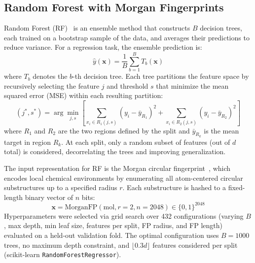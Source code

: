 \documentclass[journal=jcisd8,manuscript=article]{achemso}
\newcommand{\vect}[1]{\mathbf{#1}}
\newcommand{\removed}[1]{{\color{removedred}#1}}
\begin{document}
\FloatBarrier
\subsection{Random Forest with Morgan Fingerprints}
\label{sec:rf}

\removed{Random Forest (RF)~\cite{breiman2001random} is an ensemble method that constructs $B$ decision trees, each trained on a bootstrap sample of the data, and averages their predictions to reduce variance.
For a regression task, the ensemble prediction is:
\begin{equation}
 \hat{y}(\vect{x}) = \frac{1}{B} \sum_{b=1}^{B} T_b(\vect{x})
\end{equation}
where $T_b$ denotes the $b$-th decision tree.
Each tree partitions the feature space by recursively selecting the feature $j$ and threshold $s$ that minimize the mean squared error (MSE) within each resulting partition:
\begin{equation}
 (j^*, s^*) = \arg\min_{j, s} \left[ \sum_{x_i \in R_1(j,s)} (y_i - \bar{y}_{R_1})^2 + \sum_{x_i \in R_2(j,s)} (y_i - \bar{y}_{R_2})^2 \right]
\end{equation}
where $R_1$ and $R_2$ are the two regions defined by the split and $\bar{y}_{R_k}$ is the mean target in region $R_k$.
At each split, only a random subset of features (out of $d$ total) is considered, decorrelating the trees and improving generalization.

The input representation for RF is the Morgan circular fingerprint~\cite{rogers2010extended}, which encodes local chemical environments by enumerating all atom-centered circular substructures up to a specified radius $r$.
Each substructure is hashed to a fixed-length binary vector of $n$ bits:
\begin{equation}
 \vect{x} = \text{MorganFP}(\text{mol}, r=2, n=2048) \in \{0, 1\}^{2048}
\end{equation}
Hyperparameters were selected via grid search over 432 configurations (varying $B$, max depth, min leaf size, features per split, FP radius, and FP length) evaluated on a held-out validation fold.
The optimal configuration uses $B = 1000$ trees, no maximum depth constraint, and $\lfloor 0.3d \rfloor$ features considered per split (scikit-learn \texttt{RandomForestRegressor}).}
\end{document}
